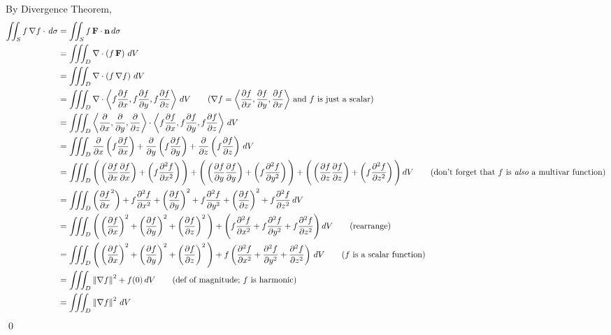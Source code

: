 \documentclass{article}
\newcommand{\lrp}[1]{\left( #1 \right)}
\newcommand{\lra}[1]{\left\langle #1 \right\rangle}
\newcommand{\norm}[1]{\left\lVert #1 \right\rVert}
\newcommand{\F}[0]{\mathbf{F}}
\newcommand{\n}[0]{\mathbf{n}}
\begin{document}
By Divergence Theorem,
\begin{align*}
    \iint_S f\,\nabla f\cdot\,d\sigma&=\iint_S f\,\F\cdot\n\,d\sigma\\
    &=\iiint_D \nabla \cdot \lrp{f\,\F}\,dV\\
    &=\iiint_D \nabla \cdot \lrp{f\,\nabla f}\,dV\\
    &=\iiint_D \nabla \cdot\lra{{f\frac{\partial f}{\partial x}, f\frac{\partial f}{\partial y},f\frac{\partial f}{\partial z}}}\,dV\tag{$\displaystyle\nabla f=\lra{\frac{\partial f}{\partial x},\frac{\partial f}{\partial y},\frac{\partial f}{\partial x}}$ and $f$ is just a scalar}\\
    &=\iiint_D \lra{\frac{\partial }{\partial x},\frac{\partial }{\partial y},\frac{\partial }{\partial z}}\cdot \lra{{f\frac{\partial f}{\partial x}, f\frac{\partial f}{\partial y},f\frac{\partial f}{\partial z}}}\,dV\\
    &=\iiint_D \frac{\partial }{\partial x}\lrp{f\frac{\partial f}{\partial x}}+\frac{\partial }{\partial y}\lrp{f\frac{\partial f}{\partial y}}+\frac{\partial }{\partial z}\lrp{f\frac{\partial f}{\partial z}}\,dV\\
    &=\iiint_D \Bigg(\lrp{\frac{\partial f}{\partial x}\frac{\partial f}{\partial x}}+\lrp{f\frac{\partial^2 f}{\partial x^2}}\Bigg)+\Bigg(\lrp{\frac{\partial f}{\partial y}\frac{\partial f}{\partial y}}+\lrp{f\frac{\partial^2 f}{\partial y^2}}\Bigg)+\Bigg(\lrp{\frac{\partial f}{\partial z}\frac{\partial f}{\partial z}}+\lrp{f\frac{\partial^2 f}{\partial z^2}}\Bigg)\,dV\tag{don't forget that $f$ is \textit{also} a multivar function}\\
    &=\iiint_D \lrp{\frac{\partial f}{\partial x}^2 }+f\frac{\partial^2 f}{\partial x^2}+\lrp{\frac{\partial f}{\partial y}}^2 + f\frac{\partial^2 f}{\partial y^2}+\lrp{\frac{\partial f}{\partial z}}^2 + f\frac{\partial ^2 f}{\partial z^2}\,dV\\
    &=\iiint_D \Bigg(\lrp{\frac{\partial f}{\partial x}}^2+\lrp{\frac{\partial f}{\partial y}}^2+\lrp{\frac{\partial f}{\partial z}}^2\Bigg)+\Bigg(f\frac{\partial^2 f}{\partial x^2}+f\frac{\partial^2 f}{\partial y^2}+f\frac{\partial^2 f}{\partial z^2}\Bigg)\,dV\tag{rearrange}\\
    &=\iiint_D \Bigg(\lrp{\frac{\partial f}{\partial x}}^2+\lrp{\frac{\partial f}{\partial y}}^2+\lrp{\frac{\partial f}{\partial z}}^2\Bigg)+f\lrp{\frac{\partial^2 f}{\partial x^2}+\frac{\partial^2 f}{\partial y^2}+\frac{\partial^2 f}{\partial z^2}}\,dV\tag{$f$ is a scalar function}\\
    &=\iiint_D \norm{\nabla f}^2 + f(0)\,dV\tag{def of magnitude; $f$ is harmonic}\\
    &=\iiint_D \norm{\nabla f}^2\,dV
\end{align*}
\qed
\end{document}
